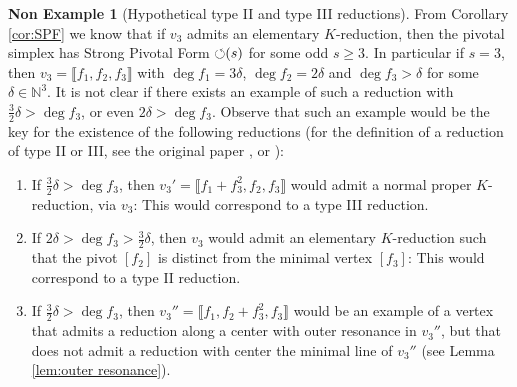 \documentclass[reqno,oneside,11pt]{amsart}
\theoremstyle{plain}
\theoremstyle{definition}
\newtheorem{nonexample}[theorem]{Non Example}
\newcommand{\N}{\mathbb{N}}
\newcommand{\PF}{\text{$\circlearrowleft$\!\,}}
\newcommand{\llb}{\llbracket}
\newcommand{\rrb}{\rrbracket}
\renewcommand{\ge}{\geqslant}
\begin{document}
\begin{nonexample}[Hypothetical type II and type III reductions] \label{nonexample}
From Corollary \ref{cor:SPF} we know that if $v_3$ admits an elementary $K$-reduction, then the pivotal simplex  
has Strong Pivotal Form $\PF(s)$ for some odd $s \ge 3$.
In particular if $s = 3$, then $v_3 = \llb f_1, f_2, f_3 \rrb$ with $\deg f_1 = 3\delta$, $\deg f_2 = 2 \delta$ and $\deg f_3 > \delta$ for some $\delta \in \N^3$.
It is not clear if there exists an example of such a reduction with $\frac32\delta > \deg f_3$, or even $2\delta > \deg f_3$.
Observe that such an example would be the key for the existence  of the following reductions (for the definition of a reduction of type II or III, see the original paper \cite{SU:main}, or \cite[\S7]{Ku:main}):
\begin{enumerate}
\item If $\frac32\delta > \deg f_3$, then $v_3' = \llb f_1 + f_3^2, f_2, f_3 \rrb$ would admit a normal proper $K$-reduction, via $v_3$: This would correspond to a type III reduction.
\item If $2\delta > \deg f_3 > \frac32\delta$, then $v_3$ would admit an elementary $K$-reduction such that the pivot $[f_2]$ is distinct from the minimal vertex $[f_3]$: This would correspond to a type II reduction.
\item If $\frac32\delta > \deg f_3$, then $v_3'' = \llb f_1 , f_2 + f_3^2, f_3 \rrb$ would be an example of a vertex that admits a reduction along a center with outer resonance in $v_3''$, but that does not admit a reduction with center the minimal line of $v_3''$ (see Lemma \ref{lem:outer resonance}).
\end{enumerate}
\end{nonexample}



\end{document}
